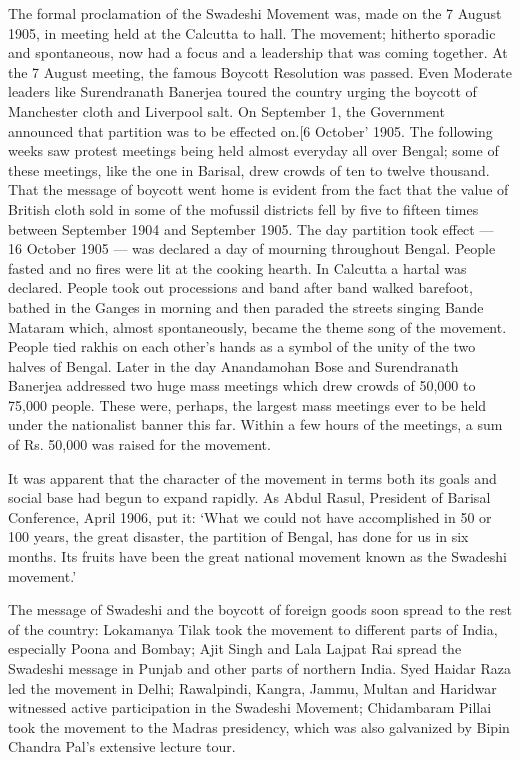 The formal proclamation of the Swadeshi Movement was, made on the 7 August 1905, in meeting held at the Calcutta to hall. The movement; hitherto sporadic and spontaneous, now had a focus and a leadership that was coming together. At the 7 August meeting, the famous Boycott Resolution was passed. Even Moderate leaders like Surendranath Banerjea toured the country urging the boycott of Manchester cloth and Liverpool salt. On September 1, the Government announced that partition was to be effected on.[6 October' 1905. The following weeks saw protest meetings being held almost everyday all over Bengal; some of these meetings, like the one in Barisal, drew crowds of ten to twelve thousand. That the message of boycott went home is evident from the fact that the value of British cloth sold in some of the mofussil districts fell by five to fifteen times between September 1904 and September 1905. The day partition took effect --- 16 October 1905 --- was declared a day of mourning throughout Bengal. People fasted and no fires were lit at the cooking hearth. In Calcutta a hartal was declared. People took out processions and band after band walked barefoot, bathed in the Ganges in morning and then paraded the streets singing Bande Mataram which, almost spontaneously, became the theme song of the movement. People tied rakhis on each other's hands as a symbol of the unity of the two halves of Bengal. Later in the day Anandamohan Bose and Surendranath Banerjea addressed two huge mass meetings which drew crowds of 50,000 to 75,000 people. These were, perhaps, the largest mass meetings ever to be held under the nationalist banner this far. Within a few hours of the meetings, a sum of Rs. 50,000 was raised for the movement.

It was apparent that the character of the movement in terms both its goals and social base had begun to expand rapidly. As Abdul Rasul, President of Barisal Conference, April 1906, put it: `What we could not have accomplished in 50 or 100 years, the great disaster, the partition of Bengal, has done for us in six months. Its fruits have been the great national movement known as the Swadeshi movement.'

The message of Swadeshi and the boycott of foreign goods soon spread to the rest of the country: Lokamanya Tilak took the movement to different parts of India, especially Poona and Bombay; Ajit Singh and Lala Lajpat Rai spread the Swadeshi message in Punjab and other parts of northern India. Syed Haidar Raza led the movement in Delhi; Rawalpindi, Kangra, Jammu, Multan and Haridwar witnessed active participation in the Swadeshi Movement; Chidambaram Pillai took the movement to the Madras presidency, which was also galvanized by Bipin Chandra Pal's extensive lecture tour.

